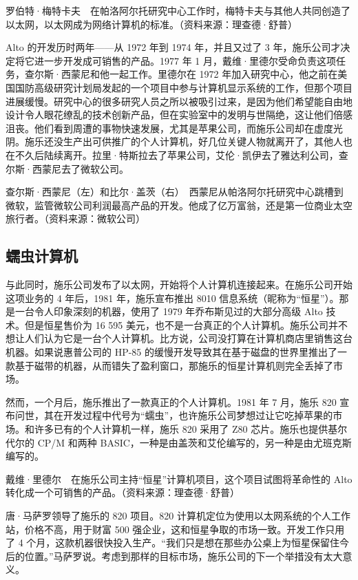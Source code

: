 \documentclass[12pt,UTF8]{ctexbook}
\begin{document}
罗伯特·梅特卡夫　在帕洛阿尔托研究中心工作时，梅特卡夫与其他人共同创造了以太网，以太网成为网络计算机的标准。（资料来源：理查德·舒普）

Alto 的开发历时两年——从 1972 年到 1974 年，并且又过了 3 年，施乐公司才决定将它进一步开发成可销售的产品。1977 年 1 月，戴维·里德尔受命负责这项任务，查尔斯·西蒙尼和他一起工作。里德尔在 1972 年加入研究中心，他之前在美国国防高级研究计划局发起的一个项目中参与计算机显示系统的工作，但那个项目进展缓慢。研究中心的很多研究人员之所以被吸引过来，是因为他们希望能自由地设计令人眼花缭乱的技术创新产品，但在实验室中的发明与世隔绝，这让他们倍感沮丧。他们看到周遭的事物快速发展，尤其是苹果公司，而施乐公司却在虚度光阴。施乐还没生产出可供推广的个人计算机，好几位关键人物就离开了，其他人也在不久后陆续离开。拉里·特斯拉去了苹果公司，艾伦·凯伊去了雅达利公司，查尔斯·西蒙尼去了微软公司。



查尔斯·西蒙尼（左）和比尔·盖茨（右）　西蒙尼从帕洛阿尔托研究中心跳槽到微软，监管微软公司利润最高产品的开发。他成了亿万富翁，还是第一位商业太空旅行者。（资料来源：微软公司）





\subsection{蠕虫计算机}


与此同时，施乐公司发布了以太网，开始将个人计算机连接起来。在施乐公司开始这项业务的 4 年后，1981 年，施乐宣布推出 8010 信息系统（昵称为“恒星”）。那是一台令人印象深刻的机器，使用了 1979 年乔布斯见过的大部分高级 Alto 技术。但是恒星售价为 16 595 美元，也不是一台真正的个人计算机。施乐公司并不想让人们认为它是一台个人计算机。比方说，公司没打算在计算机商店里销售这台机器。如果说惠普公司的 HP-85 的缓慢开发导致其在基于磁盘的世界里推出了一款基于磁带的机器，从而错失了盈利窗口，那施乐的恒星计算机则完全丢掉了市场。

然而，一个月后，施乐推出了一款真正的个人计算机。1981 年 7 月，施乐 820 宣布问世，其在开发过程中代号为“蠕虫”，也许施乐公司梦想过让它吃掉苹果的市场。和许多已有的个人计算机一样，施乐 820 采用了 Z80 芯片。施乐也提供基尔代尔的 CP/M 和两种 BASIC，一种是由盖茨和艾伦编写的，另一种是由尤班克斯编写的。



戴维·里德尔　在施乐公司主持“恒星”计算机项目，这个项目试图将革命性的 Alto 转化成一个可销售的产品。（资料来源：理查德·舒普）

唐·马萨罗领导了施乐的 820 项目。820 计算机定位为使用以太网系统的个人工作站，价格不高，用于财富 500 强企业，这和恒星争取的市场一致。开发工作只用了 4 个月，这款机器很快投入生产。“我们只是想在那些办公桌上为恒星保留住今后的位置。”马萨罗说。考虑到那样的目标市场，施乐公司的下一个举措没有太大意义。
\end{document}
